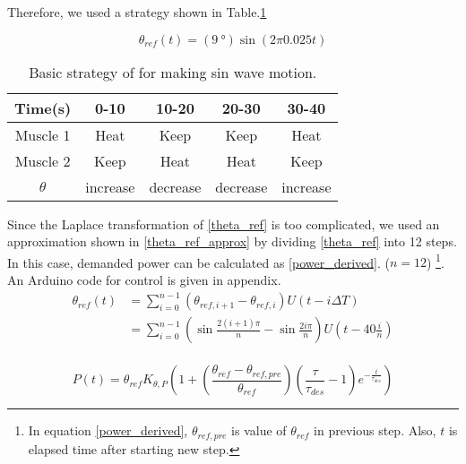 
Therefore, we used a strategy shown in Table.\ref{table_apc_basic}

\begin{equation}\label{theta_ref}
\theta_{ref}(t)=(\SI{9}{\degree})\sin(2\pi 0.025t)
\end{equation}

\begin{table}[h]
	\caption{Basic strategy of \apc for making sin wave motion.}
	\label{table_apc_basic}
	\begin{center}
		\begin{tabular}{c||c|c|c|c}
			\hline
			Time(s) & 0-10 & 10-20 & 20-30 & 30-40 \\
			\hline
			Muscle 1 & Heat & Keep & Keep & Heat \\
			Muscle 2 & Keep & Heat & Heat & Keep \\
			\hline
			$\theta$ & increase & decrease & decrease & increase \\
			\hline
		\end{tabular}
	\end{center}
\end{table}

Since the Laplace transformation of \eqref{theta_ref} is too complicated, we used an approximation shown in \eqref{theta_ref_approx} by dividing \eqref{theta_ref} into 12 steps. In this case, demanded power can be calculated as \eqref{power_derived}. ($n=12$)
\footnote{In equation \eqref{power_derived}, $\theta_{ref,pre}$ is value of $\theta_{ref}$ in previous step. Also, $t$ is elapsed time after starting new step.}. An Arduino code for control is given in appendix.
\begin{equation} \label{theta_ref_approx}
\begin{aligned} 
\theta_{ref}(t) & = \sum_{i=0}^{n-1}{(\theta_{ref,i+1}-\theta_{ref,i})U(t-i\Delta T)} \\
& = \sum_{i=0}^{n-1}{(\sin{\frac{2(i+1)\pi}{n}}-\sin{\frac{2i\pi}{n}})U(t-40\frac{i}{n})} \\
\end{aligned}
\end{equation}

\begin{equation} \label{power_derived}
P(t)=\theta_{ref}K_{\theta,P}(1+(\frac{\theta_{ref}-\theta_{ref,pre}}{\theta_{ref}})(\frac{\tau}{\tau_{des}}-1)e^{-\frac{t}{\tau_{des}}})
\end{equation}


